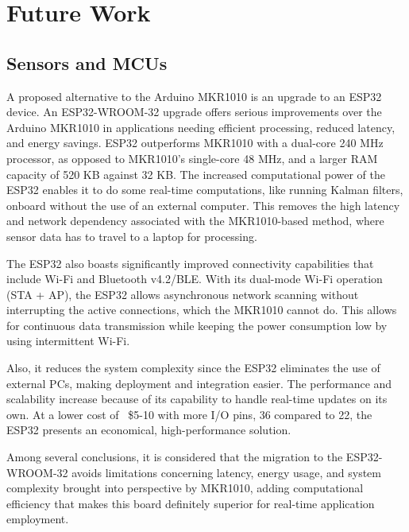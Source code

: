 \chapter{Future Work}

\section{Sensors and MCUs}

A proposed alternative to the Arduino MKR1010 is an upgrade to an ESP32 device. An ESP32-WROOM-32 upgrade offers serious improvements over the Arduino MKR1010 in applications needing efficient processing, reduced latency, and energy savings. ESP32 outperforms MKR1010 with a dual-core 240 MHz processor, as opposed to MKR1010's single-core 48 MHz, and a larger RAM capacity of 520 KB against 32 KB. The increased computational power of the ESP32 enables it to do some real-time computations, like running Kalman filters, onboard without the use of an external computer. This removes the high latency and network dependency associated with the MKR1010-based method, where sensor data has to travel to a laptop for processing.
\par
The ESP32 also boasts significantly improved connectivity capabilities that include Wi-Fi and Bluetooth v4.2/BLE. With its dual-mode Wi-Fi operation (STA + AP), the ESP32 allows asynchronous network scanning without interrupting the active connections, which the MKR1010 cannot do. This allows for continuous data transmission while keeping the power consumption low by using intermittent Wi-Fi.
\par
Also, it reduces the system complexity since the ESP32 eliminates the use of external PCs, making deployment and integration easier. The performance and scalability increase because of its capability to handle real-time updates on its own. At a lower cost of ~\$5-10 with more I/O pins, 36 compared to 22, the ESP32 presents an economical, high-performance solution.
\par
Among several conclusions, it is considered that the migration to the ESP32-WROOM-32 avoids limitations concerning latency, energy usage, and system complexity brought into perspective by MKR1010, adding computational efficiency that makes this board definitely superior for real-time application employment. \cite{brownlee_2023_numpy}

